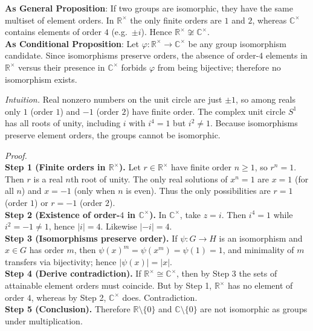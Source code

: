\documentclass[12pt]{article}
\theoremstyle{definition}
\begin{document}
\noindent\textbf{As General Proposition}: If two groups are isomorphic, they have the same multiset of element orders. In $\mathbb{R}^{\times}$ the only finite orders are $1$ and $2$, whereas $\mathbb{C}^{\times}$ contains elements of order $4$ (e.g.\ $\pm i$). Hence $\mathbb{R}^{\times}\not\cong\mathbb{C}^{\times}$.\\

\noindent \textbf{As Conditional Proposition}: Let $\varphi:\mathbb{R}^{\times}\to\mathbb{C}^{\times}$ be any group isomorphism candidate. Since isomorphisms preserve orders, the absence of order-$4$ elements in $\mathbb{R}^{\times}$ versus their presence in $\mathbb{C}^{\times}$ forbids $\varphi$ from being bijective; therefore no isomorphism exists.\\

\newpage

\dotfill

\emph{Intuition.} Real nonzero numbers on the unit circle are just $\pm1$, so among reals only $1$ (order $1$) and $-1$ (order $2$) have finite order. The complex unit circle $S^1$ has all roots of unity, including $i$ with $i^4=1$ but $i^2\neq1$. Because isomorphisms preserve element orders, the groups cannot be isomorphic.\\

\dotfill

\emph{Proof.}\\
\textbf{Step 1 (Finite orders in $\mathbb{R}^{\times}$).} Let $r\in\mathbb{R}^{\times}$ have finite order $n\ge1$, so $r^n=1$. Then $r$ is a real $n$th root of unity. The only real solutions of $x^n=1$ are $x=1$ (for all $n$) and $x=-1$ (only when $n$ is even). Thus the only possibilities are $r=1$ (order $1$) or $r=-1$ (order $2$).\\
\textbf{Step 2 (Existence of order-$4$ in $\mathbb{C}^{\times}$).} In $\mathbb{C}^{\times}$, take $z=i$. Then $i^4=1$ while $i^2=-1\neq1$, hence $|i|=4$. Likewise $|-i|=4$.\\
\textbf{Step 3 (Isomorphisms preserve order).} If $\psi:G\to H$ is an isomorphism and $x\in G$ has order $m$, then $\psi(x)^m=\psi(x^m)=\psi(1)=1$, and minimality of $m$ transfers via bijectivity; hence $|\psi(x)|=|x|$.\\
\textbf{Step 4 (Derive contradiction).} If $\mathbb{R}^{\times}\cong\mathbb{C}^{\times}$, then by Step 3 the sets of attainable element orders must coincide. But by Step 1, $\mathbb{R}^{\times}$ has no element of order $4$, whereas by Step 2, $\mathbb{C}^{\times}$ does. Contradiction.\\
\textbf{Step 5 (Conclusion).} Therefore $\mathbb{R}\setminus\{0\}$ and $\mathbb{C}\setminus\{0\}$ are not isomorphic as groups under multiplication.
\end{document}
